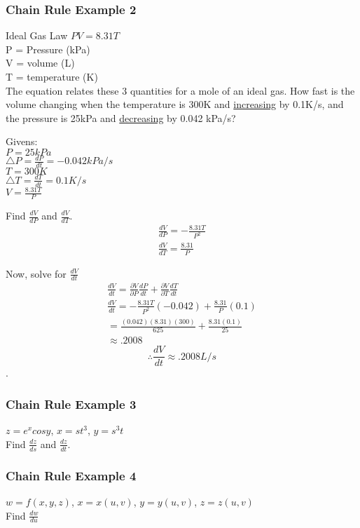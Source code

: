 \documentclass[12pt]{article}
\begin{document}
\subsubsection{Chain Rule Example 2}
Ideal Gas Law \(PV=8.31T\)\\
P = Pressure (kPa)\\
V = volume (L)\\
T = temperature (K)\\
The equation relates these 3 quantities for a mole of an ideal gas. How fast is the volume changing when the temperature is 300K and \underline{increasing} by 0.1K/s, and the pressure is 25kPa and \underline{decreasing} by 0.042 kPa/s?

Givens:\\
\(P = 25kPa\)\\
\(\triangle P = \frac{dP}{dt} = -0.042 kPa/s\)\\
\(T = 300K\)\\
\(\triangle T = \frac{dT}{dt} = 0.1K/s\)\\
\(V = \frac{8.31T}{P}\)

Find \(\frac{dV}{dP}\) and \(\frac{dV}{dT} \).
\begin{align}
	\frac{dV}{dP} = -\frac{8.31T}{P^2}\\
	\frac{dV}{dT} = \frac{8.31}{P}
\end{align}

Now, solve for \(\frac{dV}{dt}\)
\begin{align}
	\frac{dV}{dt} = \frac{\partial V}{\partial P} \frac{dP}{dt} + \frac{\partial V}{\partial T} \frac{dT}{dt}\\
	\frac{dV}{dt} = -\frac{8.31T}{P^2}(-0.042) + \frac{8.31}{P}(0.1)\\
	=\frac{(0.042)(8.31)(300)}{625} + \frac{8.31(0.1)}{25}\\
	\approx .2008
\end{align}
\[
	\therefore \frac{dV}{dt} \approx .2008 L/s
\].

\subsubsection{Chain Rule Example 3}
\(z=e^xcosy\),	\(x=st^3\), \(y=s^3t\)\\
Find \(\frac{dz}{ds}\) and \(\frac{dz}{dt}\).

\subsubsection{Chain Rule Example 4}
\(w=f(x,y,z)\), \(x=x(u,v)\), \(y=y(u,v)\), \(z=z(u,v)\)\\
Find \(\frac{dw}{du}\)
\end{document}
